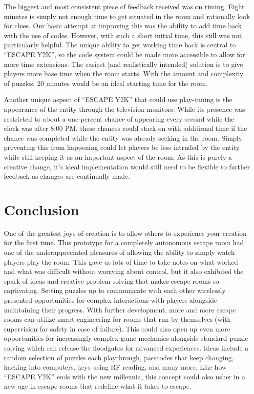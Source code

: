 \documentclass[conference]{IEEEtran}
\begin{document}
\indent The biggest and most consistent piece of feedback received was on timing. Eight minutes is simply not enough time to 
get situated in the room and rationally look for clues. Our basic attempt at improving this was the ability to add time back 
with the use of codes. However, with such a short initial time, this still was not particularly helpful. The unique ability 
to get working time back is central to ``ESCAPE Y2K'', so the code system could be made more accessible to allow for more time 
extensions. The easiest (and realistically intended) solution is to give players more base time when the room starts. With the 
amount and complexity of puzzles, 20 minutes would be an ideal starting time for the room.

\indent Another unique aspect of ``ESCAPE Y2K'' that could use play-tuning is the appearance of the entity through the television 
monitors. While its presence was restricted to about a one-percent chance of appearing every second while the clock was after 
8:00 PM, these chances could stack on with additional time if the chance was completed while the entity was already seeking in 
the room. Simply preventing this from happening could let players be less intruded by the entity, while still keeping it as an 
important aspect of the room. As this is purely a creative change, it's ideal implementation would still need to be flexible to 
further feedback as changes are continually made.


\section{Conclusion} %

\indent One of the greatest joys of creation is to allow others to experience your creation for the first time. This prototype
for a completely autonomous escape room had one of the underappreciated pleasures of allowing the ability to simply watch players play the room.
This gave us lots of time to take notes on what worked and what was difficult without worrying about control, but it also exhibited
the spark of ideas and creative problem solving that makes escape rooms so captivating. Setting puzzles up to communicate with each other
wirelessly presented opportunities for complex interactions with players alongside maintaining their progress. With further development, more and more
escape rooms can utilize smart engineering for rooms that run by themselves (with supervision for safety in case of failure). This could also open up
even more opportunities for increasingly complex game mechanics alongside standard puzzle solving which can release the floodgates for advanced experiences. 
Ideas include a random selection of puzzles each playthrough, passcodes that keep changing, hacking into computers, keys using RF reading, and many more.
Like how ``ESCAPE Y2K'' ends with the new millennia, this concept could also usher in a new age in 
escape rooms that redefine what it takes to escape.
\end{document}
